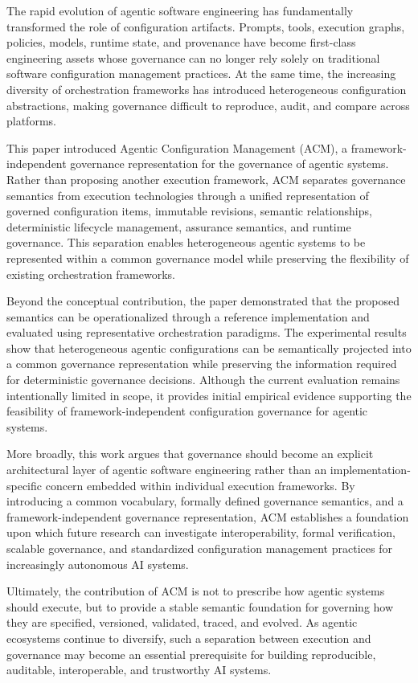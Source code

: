 \documentclass[10pt]{article}
\begin{document}
The rapid evolution of agentic software engineering has fundamentally transformed the role of configuration artifacts. Prompts, tools, execution graphs, policies, models, runtime state, and provenance have become first-class engineering assets whose governance can no longer rely solely on traditional software configuration management practices. At the same time, the increasing diversity of orchestration frameworks has introduced heterogeneous configuration abstractions, making governance difficult to reproduce, audit, and compare across platforms.

This paper introduced Agentic Configuration Management (ACM), a framework-independent governance representation for the governance of agentic systems. Rather than proposing another execution framework, ACM separates governance semantics from execution technologies through a unified representation of governed configuration items, immutable revisions, semantic relationships, deterministic lifecycle management, assurance semantics, and runtime governance. This separation enables heterogeneous agentic systems to be represented within a common governance model while preserving the flexibility of existing orchestration frameworks.

Beyond the conceptual contribution, the paper demonstrated that the proposed semantics can be operationalized through a reference implementation and evaluated using representative orchestration paradigms. The experimental results show that heterogeneous agentic configurations can be semantically projected into a common governance representation while preserving the information required for deterministic governance decisions. Although the current evaluation remains intentionally limited in scope, it provides initial empirical evidence supporting the feasibility of framework-independent configuration governance for agentic systems.

More broadly, this work argues that governance should become an explicit architectural layer of agentic software engineering rather than an implementation-specific concern embedded within individual execution frameworks. By introducing a common vocabulary, formally defined governance semantics, and a framework-independent governance representation, ACM establishes a foundation upon which future research can investigate interoperability, formal verification, scalable governance, and standardized configuration management practices for increasingly autonomous AI systems.

Ultimately, the contribution of ACM is not to prescribe how agentic systems should execute, but to provide a stable semantic foundation for governing how they are specified, versioned, validated, traced, and evolved. As agentic ecosystems continue to diversify, such a separation between execution and governance may become an essential prerequisite for building reproducible, auditable, interoperable, and trustworthy AI systems.
\end{document}
